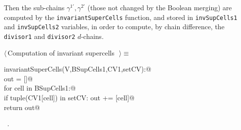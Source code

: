 \documentclass[11pt,oneside]{article}	%
\begin{document}
Then the sub-chains $\gamma^{1'},\gamma^{2'}$ (those not changed by the Boolean merging) are computed by the \texttt{invariantSuperCells} function, and stored in \texttt{invSupCells1} and \texttt{invSupCells2} variables, in order to compute, by chain difference, the \texttt{divisor1} and \texttt{divisor2} $d$-chains.

\begin{flushleft} \small \label{scrap18}
$\langle\,$Computation of invariant supercells\nobreak\ {\footnotesize {}}$\,\rangle\equiv$
\vspace{-1ex}
\begin{list}{}{} \item
\mbox{}\verb@def invariantSuperCells(V,BSupCells1,CV1,setCV):@\\
\mbox{}\verb@   out = []@\\
\mbox{}\verb@   for cell in BSupCells1:@\\
\mbox{}\verb@      if tuple(CV1[cell]) in setCV: out += [cell]@\\
\mbox{}\verb@   return out@\\
\mbox{}\verb@@{\NWsep}
\end{list}
\vspace{-1ex}
\footnotesize\addtolength{\baselineskip}{-1ex}
\begin{list}{}{\setlength{\itemsep}{-\parsep}\setlength{\itemindent}{-\leftmargin}}
\item \NWtxtMacroRefIn\ .
\end{list}
\end{flushleft}
\end{document}
